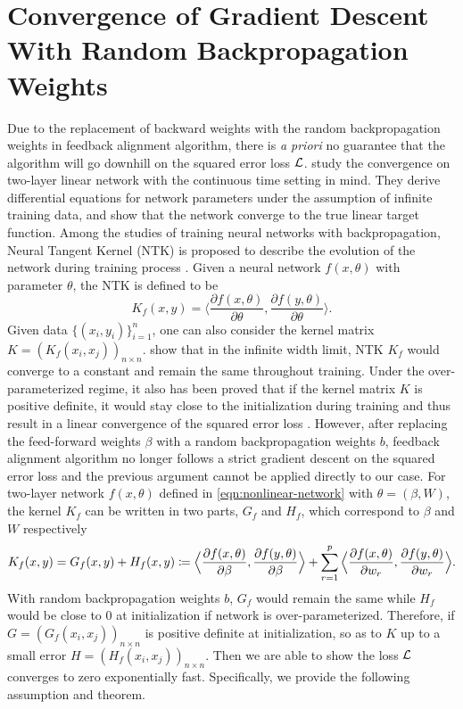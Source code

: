 
\section{Convergence of Gradient Descent With Random Backpropagation Weights}

Due to the replacement of backward weights with the random backpropagation weights in feedback alignment algorithm, there is \emph{a priori} no guarantee that the algorithm will go downhill on the squared error loss $\mathcal{L}$. \citet{lillicrap2020backpropagation} study the convergence on two-layer linear network with the continuous time setting in mind. They derive differential equations for network parameters under the assumption of infinite training data, and show that the network converge to the true linear target function.
Among the studies of training neural networks with backpropagation, Neural Tangent Kernel (NTK) is proposed to describe the evolution of the network during training process \citep{jacot2018neural}. Given a neural network $f(x,\theta)$ with parameter $\theta$, the NTK is defined to be
\begin{equation}
	K_f(x,y) = \Big\langle \frac{\partial f (x,\theta)}{\partial \theta},\frac{\partial f (y,\theta)}{\partial \theta}\Big\rangle.
\end{equation}
Given data $\{(x_i,y_i)\}_{i=1}^n$, one can also consider the kernel matrix $K = (K_f(x_i,x_j))_{n\times n}$. \citet{jacot2018neural} show that in the infinite width limit, NTK $K_f$ would converge to a constant and remain the same throughout training. Under the over-parameterized regime, it also has been proved that if the kernel matrix $K$ is positive definite, it would stay close to the initialization during training and thus result in a linear convergence of the squared error loss \citep{du2018gradient,du2019gradient,gao2020model}.
However, after replacing the feed-forward weights $\beta$ with a random backpropagation weights $b$, feedback alignment algorithm no longer follows a strict gradient descent on the squared error loss and the previous argument cannot be applied directly to our case. For two-layer network $f(x, \theta)$ defined in \eqref{eqn:nonlinear-network} with $\theta = (\beta,W)$, the kernel $K_f$ can be written in two parts, $G_f$ and $H_f$, which correspond to $\beta$ and $W$ respectively
\begin{equation}
K_f(x,y) = G_f(x, y) + H_f(x,y) \coloneqq \Big\langle \frac{\partial f (x,\theta)}{\partial \beta},\frac{\partial f (y,\theta)}{\partial \beta}\Big\rangle + \sum_{r=1}^p\Big\langle \frac{\partial f (x,\theta)}{\partial w_r},\frac{\partial f (y,\theta)}{\partial w_r}\Big\rangle.
\end{equation}
With random backpropagation weights $b$, $G_f$ would remain the same while $H_f$ would be close to 0 at initialization if network is over-parameterized. Therefore, if $G = (G_f(x_i,x_j))_{n\times n}$ is positive definite at initialization, so as to $K$ up to a small error $H = (H_f(x_i,x_j))_{n\times n}$. Then we are able to show the loss $\mathcal{L}$ converges to zero exponentially fast. Specifically, we provide the following assumption and theorem.

